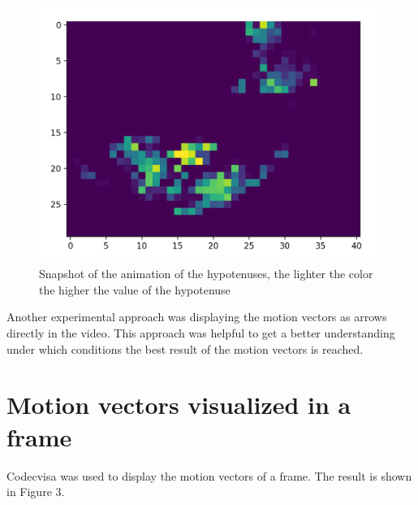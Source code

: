 \documentclass[12pt, a4paper]{report}
\begin{document}
    \noindent
    \begin{figure}[H]
    \centering
    \includegraphics[scale=0.6]{Images/animation_hypotenuse.png}
    
    \caption{Snapshot of the animation of the hypotenuses, the lighter the color the higher the value of the hypotenuse}
    \end{figure}
    
    Another experimental approach was displaying the motion vectors as arrows directly in the video. This approach was helpful to get a better understanding under which conditions the best result of the motion vectors is reached.
    \pagebreak
    
    \section{Motion vectors visualized in a frame}
    Codecvisa was used to display the motion vectors of a frame.
    The result is shown in Figure 3.
 
\end{document}
